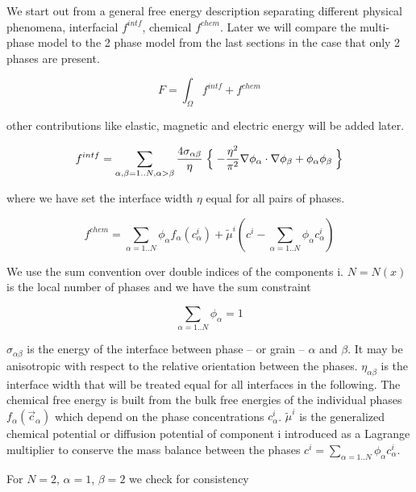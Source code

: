 We start out from a general free energy description separating different physical phenomena, interfacial $f^{intf}$, chemical $f^{chem}$. Later we will compare the multi-phase model to the 2 phase model from the last sections in the case that only 2 phases are present.

\begin{equation}
  \label{fAllgmein}
  F = \int_\Omega f^{intf} + f^{chem}
\end{equation}

other contributions like elastic, magnetic and electric energy will be added later.

\begin{equation}
  \label{fGB}
  f^{intf} = \sum_{\alpha,\beta=1..N,\alpha > \beta} \frac{4\sigma_{\alpha\beta}}{\eta} \Bigm\{ -\frac{\eta^2}{\pi^2} \nabla\phi_\alpha \cdot \nabla\phi_\beta  + \phi_\alpha \phi_\beta \Bigm\}
\end{equation}

where we have set the interface width $\eta$ equal for all pairs of phases.

\begin{equation}
  \label{fCH}
  f^{chem} = \sum_{\alpha=1..N} \phi_\alpha f_\alpha(c^i_\alpha) + \tilde\mu^i ( c^i - \sum_{\alpha=1..N} \phi_\alpha c_\alpha^i )
\end{equation}

We use the sum convention over double indices of the components i. $N=N(x)$ is the local number of phases and we have the sum constraint

\begin{equation} \label{summConstraint}
  \sum_{\alpha=1..N} \phi_\alpha = 1
\end{equation}

$\sigma_{\alpha \beta}$ is the energy of the interface between phase -- or grain -- $\alpha$ and $\beta$. It may be anisotropic with respect to the relative orientation between the phases. $\eta_{\alpha\beta}$ is the interface width that will be treated equal for all interfaces in the following. The chemical free energy is built from the bulk free energies of the individual phases $f_\alpha(\vec{c}_\alpha)$ which depend on the phase concentrations $c^i_\alpha$.  $\tilde\mu^i$ is the generalized chemical potential or diffusion potential of component i introduced as a Lagrange multiplier to conserve the mass balance between the phases $c^i = \sum_{\alpha=1..N} \phi_\alpha c_\alpha^i$.

For $N = 2$, $\alpha = 1$, $\beta = 2$ we check for consistency

